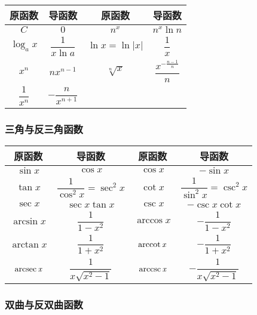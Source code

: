 \documentclass[UTF8, 12pt]{ctexart}
\begin{document}
\begin{center}
    \begin{tabular}{|c|c|c|c|}
        \hline
        原函数 & 导函数 & 原函数 & 导函数\\ \hline
        $C$ & $0$ & $n^x$ & $n^x\ln n$ \\ \hline
        $\log_ax$ & $\dfrac{1}{x\ln a}$ & $\ln x=\ln\vert x\vert$ & $\dfrac{1}{x}$ \\ \hline
        $x^n$ & $nx^{n-1}$ & $\sqrt[n]{x}$ & $\dfrac{x^{-\frac{n-1}{n}}}{n}$ \\ \hline
        $\dfrac{1}{x^n}$ & $-\dfrac{n}{x^{n+1}}$ & & \\ 
        \hline
    \end{tabular}
\end{center}

\subsubsection{三角与反三角函数}

\begin{center}
    \begin{tabular}{|c|c|c|c|}
        \hline
        原函数 & 导函数 & 原函数 & 导函数\\ \hline
        $\sin x$ & $\cos x$ & $\cos x$ & $-\sin x$ \\ \hline
        $\tan x$ & $\dfrac{1}{\cos^2x}=\sec^2x$ & $\cot x$ & $\dfrac{1}{\sin^2x}=\csc^2x$ \\ \hline
        $\sec x$ & $\sec x\tan x$ & $\csc x$ & $-\csc x\cot x$ \\ \hline
        $\arcsin x$ & $\dfrac{1}{1-x^2}$ & $\arccos x$ & $-\dfrac{1}{1-x^2}$ \\ \hline
        $\arctan x$ & $\dfrac{1}{1+x^2}$ & $\rm{arccot}\,\textit{x}$ & $-\dfrac{1}{1+x^2}$ \\ \hline
        $\rm{arcsec}\,\textit{x}$ & $\dfrac{1}{x\sqrt{x^2-1}}$ & $\rm{arccsc}\,\textit{x}$ & $-\dfrac{1}{x\sqrt{x^2-1}}$ \\ \hline
        \hline
    \end{tabular}
\end{center}

\subsubsection{双曲与反双曲函数}
\end{document}
